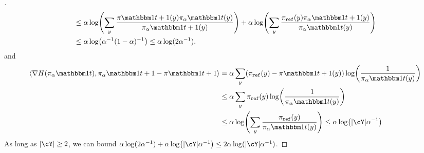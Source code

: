 \documentclass{article}
\begin{document}
\begin{proof}[]
\begin{align*}
  &\leq
    \alpha\log\prn*{\sum_{y}\frac{\pi\ind{t+1}(y)\pia\ind{t}(y)}{\pia\ind{t+1}(y)}}
    +
    \alpha\log\prn*{\sum_y\frac{\piref(y)\pia\ind{t+1}(y)}{\pia\ind{t}(y)}}\\
    &\leq
      \alpha\log\prn*{\alpha^{-1}(1-\alpha)^{-1}}
      \leq{}\alpha\log(2\alpha^{-1}).
\end{align*}
and
\begin{align*}
  \tri*{\grad{}H(\pia\ind{t}),\pia\ind{t+1}-\pi\ind{t+1}}
  &=
    \alpha\sum_{y}(\piref(y)-\pi\ind{t+1}(y))\log\prn*{\frac{1}{\pia\ind{t}(y)}}\\
  &\leq \alpha\sum_{y}\piref(y)\log\prn*{\frac{1}{\pia\ind{t}(y)}}\\
  &\leq \alpha\log\prn*{\sum_{y}\frac{\piref(y)}{\pia\ind{t}(y)}}
    \leq{}\alpha\log\prn*{\abs{\cY}\alpha^{-1}}
\end{align*}
As long as $\abs{\cY}\geq{}2$, we can bound
$\alpha\log(2\alpha^{-1})+\alpha\log\prn*{\abs{\cY}\alpha^{-1}}
\leq{}2\alpha\log(\abs{\cY}\alpha^{-1})$.
\end{proof}
\end{document}
